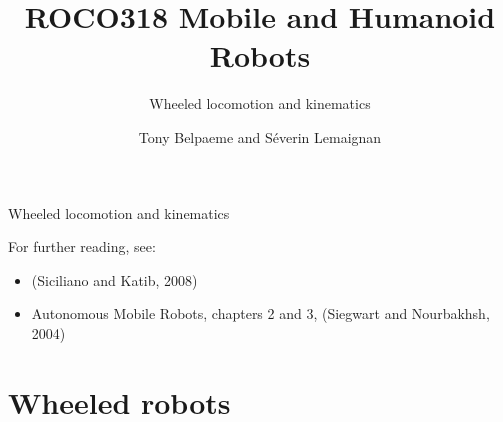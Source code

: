 \documentclass[compress]{beamer}
\title{ROCO318 \newline Mobile and Humanoid Robots}
\subtitle{Wheeled locomotion and kinematics}
\date{}
\author{Tony Belpaeme and Séverin Lemaignan}
\institute{Centre for Neural Systems and Robotics\\{\bf Plymouth University}}
\begin{document}

\maketitle

\begin{frame}{Wheeled locomotion and kinematics}

For further reading, see:
    
    \begin{itemize}
        \item (Siciliano and Katib, 2008)
        \item Autonomous Mobile Robots, chapters 2 and 3, (Siegwart and Nourbakhsh, 2004)
    \end{itemize}
\end{frame}

\section{Wheeled robots}
\end{document}
